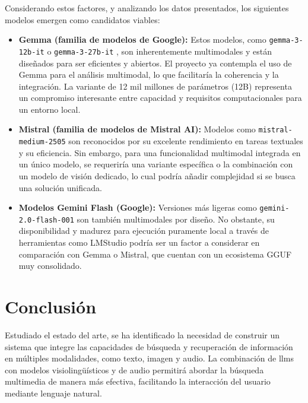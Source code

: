 Considerando estos factores, y analizando los datos presentados, los siguientes modelos emergen como candidatos viables:

\begin{itemize}
  \item \textbf{Gemma (familia de modelos de Google):} Estos modelos, como \texttt{gemma-3-12b-it} o \texttt{gemma-3-27b-it} \citep{noauthor_welcome_2025}, son inherentemente multimodales y están diseñados para ser eficientes y abiertos. El proyecto ya contempla el uso de Gemma para el análisis multimodal, lo que facilitaría la coherencia y la integración. La variante de 12 mil millones de parámetros (12B) representa un compromiso interesante entre capacidad y requisitos computacionales para un entorno local.
  \item \textbf{Mistral (familia de modelos de Mistral AI):} Modelos como \texttt{mistral-medium-2505} son reconocidos por su excelente rendimiento en tareas textuales y su eficiencia. Sin embargo, para una funcionalidad multimodal integrada en un único modelo, se requeriría una variante específica o la combinación con un modelo de visión dedicado, lo cual podría añadir complejidad si se busca una solución unificada.
  \item \textbf{Modelos Gemini Flash (Google):} Versiones más ligeras como \texttt{gemini-2.0-flash-001} son también multimodales por diseño. No obstante, su disponibilidad y madurez para ejecución puramente local a través de herramientas como LMStudio podría ser un factor a considerar en comparación con Gemma o Mistral, que cuentan con un ecosistema GGUF muy consolidado.
\end{itemize}

\section{Conclusión}
\label{sec:conclusion}

Estudiado el estado del arte, se ha identificado la necesidad de construir un sistema que integre las capacidades de búsqueda y recuperación de información en múltiples modalidades, como texto, imagen y audio. La combinación de \glspl{llm} con modelos visiolingüísticos y de audio permitirá abordar la búsqueda multimedia de manera más efectiva, facilitando la interacción del usuario mediante lenguaje natural.